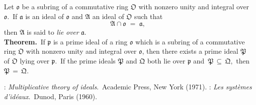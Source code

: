 \documentclass[12pt]{article}
\theoremstyle{definition}
\begin{document}
Let $\mathfrak{o}$ be a subring of a commutative ring $\mathfrak{O}$ with nonzero unity and integral over 
$\mathfrak{o}$.\, If $\mathfrak{a}$ is an ideal of $\mathfrak{o}$ and $\mathfrak{A}$ an ideal of $\mathfrak{O}$ such that
$$\mathfrak{A\cap o \;=\; a},$$
then $\mathfrak{A}$ is said to \emph{lie over} $\mathfrak{a}$.\\


\textbf{Theorem.}\, If $\mathfrak{p}$ is a prime ideal of a ring $\mathfrak{o}$ which is a subring of a commutative ring $\mathfrak{O}$ with nonzero unity and integral over $\mathfrak{o}$, then there exists a prime ideal $\mathfrak{P}$ of 
$\mathfrak{O}$ lying over $\mathfrak{p}$.\, If the prime ideals $\mathfrak{P}$ and $\mathfrak{Q}$ both lie over 
$\mathfrak{p}$ and\, $\mathfrak{P \,\subseteq\, Q}$,\, then\, $\mathfrak{P \,=\, Q}$.



\begin{thebibliography}{8}
: {\em Multiplicative theory of ideals}.\, Academic Press, New York (1971).
: {\em Les syst\`emes d'id\'eaux}.\, Dunod, Paris (1960).
\end{thebibliography}
\end{document}
